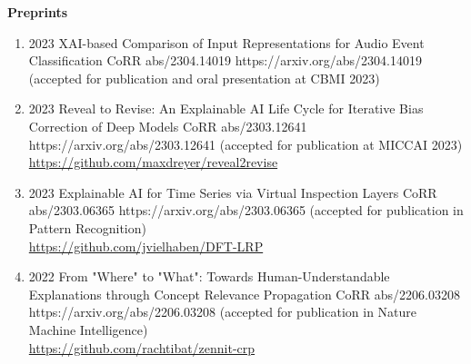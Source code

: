 \headedsection %
{\bf Preprints}{}
{
    \begin{enumerate}

        \item {}
                        {2023}
                        {XAI-based Comparison of Input Representations for Audio Event Classification}
                        {CoRR abs/2304.14019}
                        {https://arxiv.org/abs/2304.14019}
                        {(accepted for publication and oral presentation at CBMI 2023)}
                
        \item {}
                        {2023}
                        {Reveal to Revise: An Explainable AI Life Cycle for Iterative Bias Correction of Deep Models}
                        {CoRR abs/2303.12641}
                        {https://arxiv.org/abs/2303.12641}
                        {(accepted for publication at MICCAI 2023)\\ \href{https://github.com/maxdreyer/reveal2revise}{https://github.com/maxdreyer/reveal2revise}}
        
        \item {}
                        {2023}
                        {Explainable AI for Time Series via Virtual Inspection Layers}
                        {CoRR abs/2303.06365}
                        {https://arxiv.org/abs/2303.06365}
                        {(accepted for publication in Pattern Recognition)\\ \href{https://github.com/jvielhaben/DFT-LRP}{https://github.com/jvielhaben/DFT-LRP}}

        \newpage %
        \item {}
                        {2022}
                        {From "Where" to "What": Towards Human-Understandable Explanations through Concept Relevance Propagation}
                        {CoRR abs/2206.03208}
                        {https://arxiv.org/abs/2206.03208}
                        {(accepted for publication in Nature Machine Intelligence)\\ \href{https://github.com/rachtibat/zennit-crp}{https://github.com/rachtibat/zennit-crp}}


\end{enumerate}}
